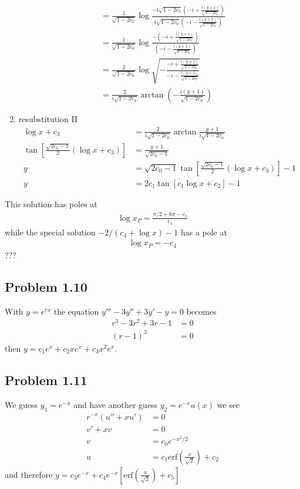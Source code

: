 \documentclass[../main.tex]{subfiles}
\begin{document}
\begin{enumerate}
\begin{align}
        &=\frac{1}{\sqrt{1-2c_0}}\log\frac{-i\sqrt{1-2c_0}\left(-i+\frac{i(y+1)}{\sqrt{1-2c_0}}\right)}{i\sqrt{1-2c_0}\left(-i-\frac{i(y+1)}{\sqrt{1-2c_0}}\right)}\\
        &=\frac{1}{\sqrt{1-2c_0}}\log\frac{-\left(-i+\frac{i(y+1)}{\sqrt{1-2c_0}}\right)}{\left(-i-\frac{i(y+1)}{\sqrt{1-2c_0}}\right)}\\
        &=\frac{2}{\sqrt{1-2c_0}}\log\sqrt{-\frac{-i+\frac{i(y+1)}{\sqrt{1-2c_0}}}{-i-\frac{i(y+1)}{\sqrt{1-2c_0}}}}\\
        &=\frac{2}{i\sqrt{1-2c_0}}\arctan\left(-\frac{i(y+1)}{\sqrt{1-2c_0}}\right)
    \end{align}
    \item resubstitution II
    \begin{align}
        \log x+c_3&=\frac{2}{i\sqrt{1-2c_0}}\arctan \frac{y+1}{i\sqrt{1-2c_0}}\\
        \tan\left[\frac{\sqrt{2c_0-1}}{2}(\log x+c_3)\right]&=\frac{y+1}{\sqrt{2c_0-1}}\\
        y&=\sqrt{2c_0-1}\tan\left[\frac{\sqrt{2c_0-1}}{2}(\log x+c_3)\right]-1\\
        y&=2c_1\tan\left[c_1\log x+c_2\right]-1
    \end{align}

\end{enumerate}
This solution has poles at
\begin{align}
    \log x_P =\frac{\pi/2+k\pi-c_2}{c_1}
\end{align}
while the special solution $-2/(c_4+\log x)-1$ has a pole at
\begin{align}
    \log x_P=-c_4
\end{align}
???

\subsection{Problem 1.10}
With $y=e^{rx}$ the equation $y'''-3y''+3y'-y=0$ becomes
\begin{align}
    r^3-3r^2+3r-1&=0\\
    (r-1)^3&=0
\end{align}
then $y=c_1e^x+c_2xe^x+c_3x^2e^x$.

\subsection{Problem 1.11}
We guess $y_1=e^{-x}$ and have another guess  $y_2=e^{-x}u(x)$ we see
\begin{align}
    r^{-x}\left(u''+xu'\right)&=0\\
    v'+xv&=0\\
    v&=c_0e^{-x^2/2}\\
    u&=c_1\text{erf}\left(\frac{x}{\sqrt{2}}\right)+c_2
\end{align}
and therefore $y=c_3e^{-x}+c_4e^{-x}\left[\text{erf}\left(\frac{x}{\sqrt{2}}\right)+c_5\right]$
\end{document}
